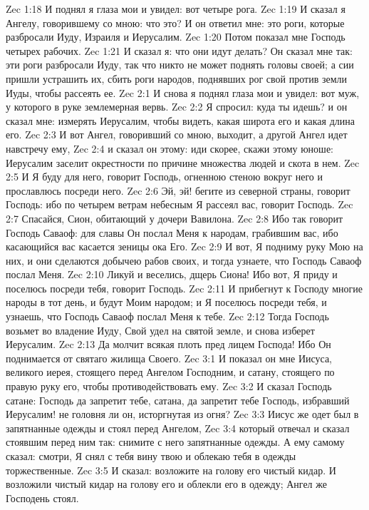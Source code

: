 \vs Zec 1:18 И поднял я глаза мои и увидел: вот четыре рога.
\vs Zec 1:19 И сказал я Ангелу, говорившему со мною: что это? И он ответил мне: это роги, которые разбросали Иуду, Израиля и Иерусалим.
\vs Zec 1:20 Потом показал мне Господь четырех рабочих.
\vs Zec 1:21 И сказал я: что они идут делать? Он сказал мне так: эти роги разбросали Иуду, так что никто не может поднять головы своей; а сии пришли устрашить их, сбить роги народов, поднявших рог свой против земли Иуды, чтобы рассеять ее.
\vs Zec 2:1 И снова я поднял глаза мои и увидел: вот муж, у которого в руке землемерная вервь.
\vs Zec 2:2 Я спросил: куда ты идешь? и он сказал мне: измерять Иерусалим, чтобы видеть, какая широта его и какая длина его.
\vs Zec 2:3 И вот Ангел, говоривший со мною, выходит, а другой Ангел идет навстречу ему,
\vs Zec 2:4 и сказал он этому: иди скорее, скажи этому юноше: Иерусалим заселит окрестности по причине множества людей и скота в нем.
\vs Zec 2:5 И Я буду для него, говорит Господь, огненною стеною вокруг него и прославлюсь посреди него.
\vs Zec 2:6 Эй, эй! бегите из северной страны, говорит Господь: ибо по четырем ветрам небесным Я рассеял вас, говорит Господь.
\vs Zec 2:7 Спасайся, Сион, обитающий у дочери Вавилона.
\vs Zec 2:8 Ибо так говорит Господь Саваоф: для славы Он послал Меня к народам, грабившим вас, ибо касающийся вас касается зеницы ока Его.
\vs Zec 2:9 И вот, Я подниму руку Мою на них, и они сделаются добычею рабов своих, и тогда узнаете, что Господь Саваоф послал Меня.
\vs Zec 2:10 Ликуй и веселись, дщерь Сиона! Ибо вот, Я приду и поселюсь посреди тебя, говорит Господь.
\vs Zec 2:11 И прибегнут к Господу многие народы в тот день, и будут Моим народом; и Я поселюсь посреди тебя, и узнаешь, что Господь Саваоф послал Меня к тебе.
\vs Zec 2:12 Тогда Господь возьмет во владение Иуду, Свой удел на святой земле, и снова изберет Иерусалим.
\vs Zec 2:13 Да молчит всякая плоть пред лицем Господа! Ибо Он поднимается от святаго жилища Своего.
\vs Zec 3:1 И показал он мне Иисуса, великого иерея, стоящего перед Ангелом Господним, и сатану, стоящего по правую руку его, чтобы противодействовать ему.
\vs Zec 3:2 И сказал Господь сатане: Господь да запретит тебе, сатана, да запретит тебе Господь, избравший Иерусалим! не головня ли он, исторгнутая из огня?
\vs Zec 3:3 Иисус же одет был в запятнанные одежды и стоял перед Ангелом,
\vs Zec 3:4 который отвечал и сказал стоявшим перед ним так: снимите с него запятнанные одежды. А ему самому сказал: смотри, Я снял с тебя вину твою и облекаю тебя в одежды торжественные.
\vs Zec 3:5 И сказал: возложите на голову его чистый кидар. И возложили чистый кидар на голову его и облекли его в одежду; Ангел же Господень стоял.
